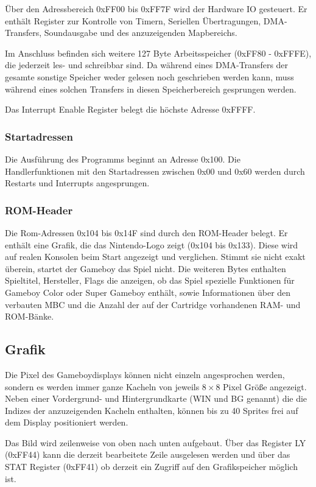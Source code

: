 \documentclass[a4paper]{scrartcl}
\begin{document}
Über den Adressbereich 0xFF00 bis 0xFF7F wird der Hardware IO gesteuert. Er enthält Register zur Kontrolle von Timern, Seriellen Übertragungen, DMA-Transfers, Soundausgabe und des anzuzeigenden Mapbereichs.

Im Anschluss befinden sich weitere 127 Byte Arbeitsspeicher (0xFF80 - 0xFFFE), die jederzeit les- und schreibbar sind. Da während eines DMA-Transfers der gesamte sonstige Speicher weder gelesen noch geschrieben werden kann, muss während eines solchen Transfers in diesen Speicherbereich gesprungen werden.

Das Interrupt Enable Register belegt die höchste Adresse 0xFFFF.

\subsubsection{Startadressen}

Die Ausführung des Programms beginnt an Adresse 0x100. Die Handlerfunktionen mit den Startadressen zwischen 0x00 und 0x60 werden durch Restarts und Interrupts angesprungen. 

\subsubsection{ROM-Header}

Die Rom-Adressen 0x104 bis 0x14F sind durch den ROM-Header belegt. Er enthält eine Grafik, die das Nintendo-Logo zeigt (0x104 bis 0x133). Diese wird auf realen Konsolen beim Start angezeigt und verglichen. Stimmt sie nicht exakt überein, startet der Gameboy das Spiel nicht. Die weiteren Bytes enthalten Spieltitel, Hersteller, Flags die anzeigen, ob das Spiel spezielle Funktionen für Gameboy Color oder Super Gameboy enthält, sowie Informationen über den verbauten MBC und die Anzahl der auf der Cartridge vorhandenen RAM- und ROM-Bänke.
\subsection{Grafik}

Die Pixel des Gameboydisplays können nicht einzeln angesprochen werden, sondern es werden immer ganze Kacheln von jeweils $8 \times 8$ Pixel Größe angezeigt. Neben einer Vordergrund- und Hintergrundkarte (WIN und BG genannt) die die Indizes der anzuzeigenden Kacheln enthalten, können bis zu 40 Sprites frei auf dem Display positioniert werden.

Das Bild wird zeilenweise von oben nach unten aufgebaut. Über das Register LY (0xFF44) kann die derzeit bearbeitete Zeile ausgelesen werden und über das STAT Register (0xFF41) ob derzeit ein Zugriff auf den Grafikspeicher möglich ist.
\end{document}
